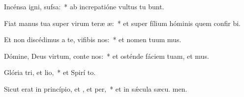\item Incénsa igni,  sufsa:~* ab increpatióne vultus tu bunt.
\item Fiat manus tua super virum teræ æ:~* et super fílium hóminis quem confir bi.
\item Et non discédimus a te, vifibis nos:~* et nomen tuum mus.
\item Dómine, Deus virtum, conte nos:~* et osténde fáciem tuam, et  mus.
\item Glória tri, et lio,~* et Spirí to.
\item Sicut erat in princípio, et , et per,~* et in sǽcula sæcu. men.
